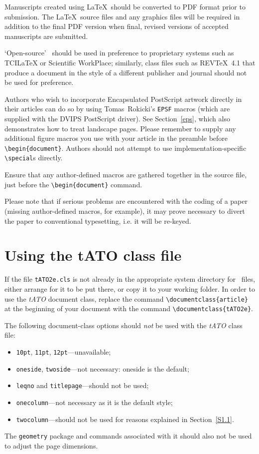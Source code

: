 \documentclass{tATO2e}
\begin{document}
Manuscripts created using \LaTeX\ should be converted to PDF format prior to submission. The \LaTeX\ source files and any graphics files will be required in addition to the final PDF version when final, revised versions of accepted manuscripts are submitted.

`Open-source' \LaTeXe\ should be used in preference to proprietary systems such as TCILaTeX or Scientific WorkPlace; similarly, class files such as REVTeX~4.1 that produce a document in the style of a different publisher and journal should not be used for preference.

Authors who wish to incorporate Encapsulated PostScript artwork directly in their articles can do so by using
Tomas~Rokicki's {\tt EPSF} macros (which are supplied with the DVIPS PostScript driver). See Section~\ref{eps},
which also demonstrates how to treat landscape pages. Please remember to supply any additional figure macros you
use with your article in the preamble before \verb"\begin{document}". Authors should not attempt to use
implementation-specific \verb"\special"s directly.

Ensure that any author-defined macros are gathered together in the source file, just before the
\verb"\begin{document}" command.

Please note that if serious problems are encountered with the coding of a paper (missing author-defined macros,
for example), it may prove necessary to divert the paper to conventional typesetting, i.e. it will be re-keyed.


\section{Using the {\bi tATO} class file}

If the file {\tt tATO2e.cls} is not already in the appropriate system directory for \LaTeXe\ files, either
arrange for it to be put there, or copy it to your working folder. In order to use the {\it tATO} document class, replace the command
\verb"\documentclass{article}" at the beginning of your document with the command
\verb"\documentclass{tATO2e}".

The following document-class options should {\em not\/} be used with the {\it tATO} class file:
%
\begin{itemize}
   \item {\tt 10pt}, {\tt 11pt}, {\tt 12pt}---unavailable;
   \item {\tt oneside}, {\tt twoside}---not necessary: oneside is the default;
   \item {\tt leqno} and {\tt titlepage}---should not be used;
   \item {\tt onecolumn}---not necessary as it is the default style;
   \item {\tt twocolumn}---should not be used for reasons explained in Section~\ref{S1.1}.
\end{itemize}
%
The \texttt{geometry} package and commands associated with it should also not be used to adjust the page dimensions.
\end{document}
